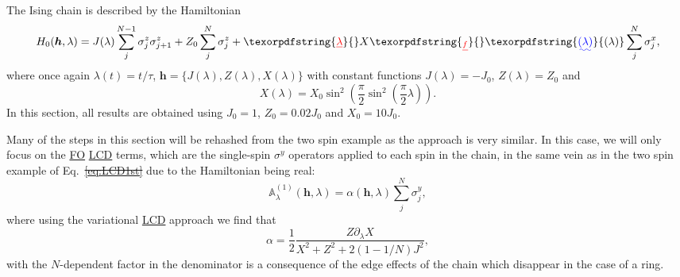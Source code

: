 \documentclass[a4paper,oneside,11pt]{book}
\newcommand{\hbb}{\boldsymbol{h}}
\newcommand{\sx}{\sigma^x}
\newcommand{\sy}{\sigma^y}
\newcommand{\sz}{\sigma^z}
\newcommand{\dlambda}{\partial_{\lambda}}
\newcommand{\approxAGP}{\mathbb{A}_{\lambda}}
\newcommand{\acrref}[1]{\hyperref[acr:#1]{#1}}
\providecommand{\DIFaddtex}[1]{{\protect\color{blue}\uwave{#1}}} %
\providecommand{\DIFdeltex}[1]{{\protect\color{red}\sout{#1}}}                      %
\providecommand{\DIFaddbegin}{} %
\providecommand{\DIFaddend}{} %
\providecommand{\DIFdelbegin}{} %
\providecommand{\DIFdelend}{} %
\providecommand{\DIFadd}[1]{\texorpdfstring{\DIFaddtex{#1}}{#1}} %
\providecommand{\DIFdel}[1]{\texorpdfstring{\DIFdeltex{#1}}{}} %
\newcommand{\DIFscaledelfig}{0.5}
\newlength{\DIFdelgraphicswidth} %
\newlength{\DIFdelgraphicsheight} %
\newcommand{\DIFaddincludegraphics}[2][]{{\color{blue}\fbox{\DIFOincludegraphics[#1]{#2}}}} %
\newcommand{\DIFdelincludegraphics}[2][]{%
\sbox{\DIFdelgraphicsbox}{\DIFOincludegraphics[#1]{#2}}%
\settoboxwidth{\DIFdelgraphicswidth}{\DIFdelgraphicsbox} %
\settoboxtotalheight{\DIFdelgraphicsheight}{\DIFdelgraphicsbox} %
\scalebox{\DIFscaledelfig}{%
\parbox[b]{\DIFdelgraphicswidth}{\usebox{\DIFdelgraphicsbox}\\[-\baselineskip] \rule{\DIFdelgraphicswidth}{0em}}\llap{\resizebox{\DIFdelgraphicswidth}{\DIFdelgraphicsheight}{%
\setlength{\unitlength}{\DIFdelgraphicswidth}%
\begin{picture}(1,1)%
\thicklines\linethickness{2pt} %
{\color[rgb]{1,0,0}\put(0,0){\framebox(1,1){}}}%
{\color[rgb]{1,0,0}\put(0,0){\line( 1,1){1}}}%
{\color[rgb]{1,0,0}\put(0,1){\line(1,-1){1}}}%
\end{picture}%
}\hspace*{3pt}}} %
} %
\DeclareRobustCommand{\DIFaddbegin}{\DIFOaddbegin \let\includegraphics\DIFaddincludegraphics} %
\DeclareRobustCommand{\DIFaddend}{\DIFOaddend \let\includegraphics\DIFOincludegraphics} %
\DeclareRobustCommand{\DIFdelbegin}{\DIFOdelbegin \let\includegraphics\DIFdelincludegraphics} %
\DeclareRobustCommand{\DIFdelend}{\DIFOaddend \let\includegraphics\DIFOincludegraphics} %
\begin{document}
The Ising chain is described by the Hamiltonian
\begin{equation}\label{eq:ising_chain_hamiltonian}
    H_0(\hbb,\lambda) = J(\lambda) \sum_{j}^{N-1} \sz_j \sz_{j+1} + Z_0\sum_j^N \sz_j + \DIFdelbegin \DIFdel{\lambda }\DIFdelend X\DIFdelbegin \DIFdel{_f }\DIFdelend \DIFaddbegin \DIFadd{(\lambda) }\DIFaddend \sum_j^N \sx_j,
\end{equation}
where once again $\lambda(t) = t/\tau$, $\hbb = \{ J(\lambda), Z(\lambda), X(\lambda) \}$ with constant functions $J(\lambda) = -J_0$, $Z(\lambda) = Z_0$ and
\begin{equation}
    X(\lambda) = X_0 \sin^2\left(\frac{\pi}{2} \sin^2 \left( \frac{\pi}{2} \lambda \right) \right).
\end{equation}
In this section, all results are obtained using $J_0 = 1$, $Z_0 = 0.02J_0$ and $X_0 = 10J_0$.

Many of the steps in this section will be rehashed from the two spin example as the approach is very similar. In this case, we will only focus on the \acrref{FO} \acrref{LCD} terms, which are the single-spin $\sy$ operators applied to each spin in the chain, in the same vein as in the two spin example  of Eq.~\DIFdelbegin \DIFdel{\ref{eq:LCD1st} }\DIFdelend \DIFaddbegin \DIFadd{\eqref{eq:LCD1st} }\DIFaddend due to the Hamiltonian being real:
\begin{equation}\label{eq:ising_fo_agp}
    \approxAGP^{(1)}(\hbb, \lambda) = \alpha(\hbb, \lambda) \sum_{j}^N\sy_j,
\end{equation}
where using the variational \acrref{LCD} approach we find that 
\begin{equation}
    \alpha = \frac{1}{2} \frac{Z \dlambda X}{X^2 + Z^2 + 2(1 - 1/N)J^2},
\end{equation}
with the $N$-dependent factor in the denominator is a consequence of the edge effects of the chain which disappear in the case of a ring. 
\end{document}
